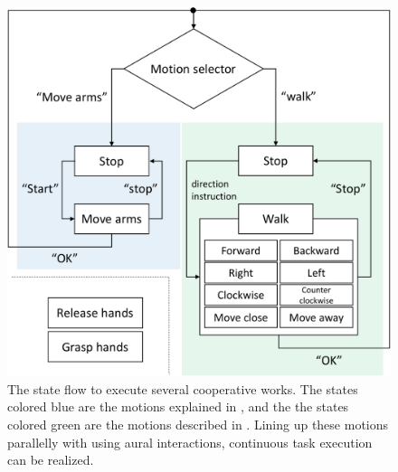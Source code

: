 \begin{figure}[htbp]
  \begin{center}
    \includegraphics[width=0.80\columnwidth]{figs/motion_selector3}
    \caption{The state flow to execute several cooperative works. The states colored blue are the motions explained in , and the the states colored green are the motions described in . Lining up these motions parallelly with using aural interactions, continuous task execution can be realized.}
    \label{figure:speech_flow}
  \end{center}
  \vspace{-3mm}
\end{figure}


